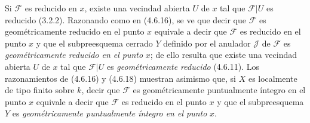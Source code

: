 
Si $\mathscr F$ es reducido en $x$, existe una vecindad abierta $U$ de $x$ tal
que $\mathscr F|U$ es reducido (3.2.2). Razonando como en (4.6.16), se ve que
decir que $\mathscr F$ es geométricamente reducido en el punto $x$ equivale a
decir que $\mathscr F$ es reducido en el punto $x$ y que el subpreesquema
cerrado $Y$ definido por el anulador $\mathscr J$ de $\mathscr F$ es
\emph{geométricamente reducido en el punto} $x$; de ello resulta que existe una vecindad
abierta $U$ de $x$ tal que $\mathscr F|U$ es \emph{geométricamente reducido} (4.6.11).
Los razonamientos de (4.6.16) y (4.6.18) muestran asimismo que, si $X$ es
localmente de tipo finito sobre $k$, decir que $\mathscr F$ es geométricamente
puntualmente íntegro en el punto $x$ equivale a decir que $\mathscr F$ es
reducido en el punto $x$ y que el subpreesquema $Y$ es \emph{geométricamente
puntualmente íntegro en el punto} $x$.

